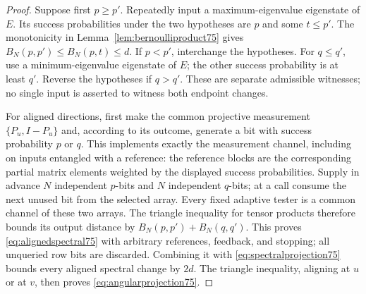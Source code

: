 \begin{proof}
Suppose first $p\ge p'$.  Repeatedly input a maximum-eigenvalue
eigenstate of $E$.  Its success probabilities under the two
hypotheses are $p$ and some $t\le p'$.  The monotonicity in
Lemma~\ref{lem:bernoulliproduct75} gives
$B_N(p,p')\le B_N(p,t)\le d$.  If $p<p'$, interchange the
hypotheses.  For $q\le q'$, use a minimum-eigenvalue eigenstate
of $E$; the other success probability is at least $q'$.  Reverse
the hypotheses if $q>q'$.  These are separate admissible witnesses;
no single input is asserted to witness both endpoint changes.

For aligned directions, first make the common projective measurement
$\{P_u,I-P_u\}$ and, according to its outcome, generate a bit with
success probability $p$ or $q$.  This implements exactly the
measurement channel, including on inputs entangled with a reference:
the reference blocks are the corresponding partial matrix elements
weighted by the displayed success probabilities.  Supply in advance
$N$ independent $p$-bits and $N$ independent $q$-bits; at a call
consume the next unused bit from the selected array.  Every fixed
adaptive tester is a common channel of these two arrays.  The
triangle inequality for tensor products therefore bounds its output
distance by $B_N(p,p')+B_N(q,q')$.  This proves
\eqref{eq:alignedspectral75} with arbitrary references, feedback,
and stopping; all unqueried row bits are discarded. Combining it with
\eqref{eq:spectralprojection75} bounds every aligned spectral
change by $2d$.  The triangle inequality, aligning at $u$ or at $v$,
then proves \eqref{eq:angularprojection75}.
\end{proof}

